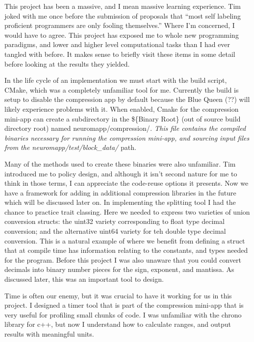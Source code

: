 \documentclass[12pt,twocolumn]{article}
\begin{document}
This project has been a massive, and I mean massive learning experience.
Tim joked with me once before the submission of proposals that ``most
self labeling proficient programmers are only fooling themselves.''
Where I'm concerned, I would have to agree. This project has exposed me
to whole new programming paradigms, and lower and higher level
computational tasks than I had ever tangled with before. It makes sense
to briefly visit these items in some detail before looking at the
results they yielded.

In the life cycle of an implementation we must start with the build
script, CMake, which was a completely unfamiliar tool for me. Currently
the build is setup to disable the compression app by default because the
Blue Queen (??) will likely experience problems with it. When enabled,
Cmake for the compression mini-app can create a subdirectory in the
\$\{Binary Root\} (out of source build directory root) named
neuromapp/compression/\emph{. This file contains the compiled binaries
necessary for running the compression mini-app, and sourcing input files
from the neuromapp/test/block\_data/} path.

Many of the methods used to create these binaries were also unfamiliar.
Tim introduced me to policy design, and although it isn't second nature
for me to think in those terms, I can appreciate the code-reuse options
it presents. Now we have a framework for adding in additional
compression libraries in the future which will be discussed later on. In
implementing the splitting tool I had the chance to practice trait
classing. Here we needed to express two varieties of union conversion
structs: the uint32 variety corresponding to float type decimal
conversion; and the alternative uint64 variety for teh double type
decimal conversion. This is a natural example of where we benefit from
defining a struct that at compile time has information relating to the
constants, and types needed for the program. Before this project I was
also unaware that you could convert decimals into binary number pieces
for the sign, exponent, and mantissa. As discussed later, this was an
important tool to design.

Time is often our enemy, but it was crucial to have it working for us in
this project. I designed a timer tool that is part of the compression
mini-app that is very useful for profiling small chunks of code. I was
unfamiliar with the chrono library for c++, but now I understand how to
calculate ranges, and output results with meaningful units.
\end{document}
